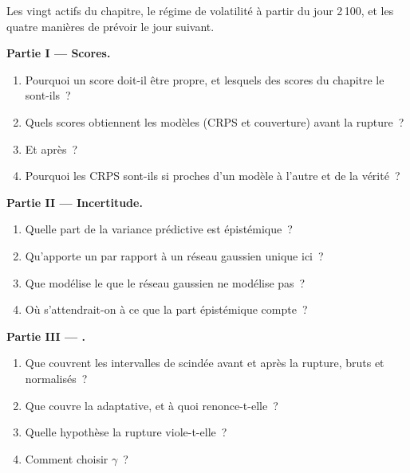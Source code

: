 \begin{problem}\label{pb:ml:probabilistic-models-and-uncertainty:1}
Les vingt actifs du chapitre, le régime de volatilité à partir du jour 2\,100, et les quatre manières de prévoir le jour suivant.

\medskip\noindent\textbf{Partie I --- Scores.}
\begin{enumerate}
\item Pourquoi un score doit-il être propre, et lesquels des scores du chapitre le sont-ils~?
\item Quels scores obtiennent les modèles (CRPS et couverture) avant la rupture~?
\item Et après~?
\item Pourquoi les CRPS sont-ils si proches d'un modèle à l'autre et de la vérité~?
\end{enumerate}

\medskip\noindent\textbf{Partie II --- Incertitude.}
\begin{enumerate}[resume]
\item Quelle part de la variance prédictive est épistémique~?
\item Qu'apporte un  par rapport à un réseau gaussien unique ici~?
\item Que modélise le  que le réseau gaussien ne modélise pas~?
\item Où s'attendrait-on à ce que la part épistémique compte~?
\end{enumerate}

\medskip\noindent\textbf{Partie III --- .}
\begin{enumerate}[resume]
\item Que couvrent les intervalles de  scindée avant et après la rupture, bruts et normalisés~?
\item Que couvre la  adaptative, et à quoi renonce-t-elle~?
\item Quelle hypothèse la rupture viole-t-elle~?
\item Comment choisir $\gamma$~?
\end{enumerate}


\end{problem}
